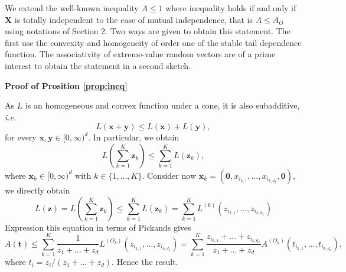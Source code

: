 \documentclass[11pt]{article}
\makeatletter
\renewenvironment{proof}[1][\proofname]{\par
\pushQED{\qed}%
\normalfont \topsep6\p@\@plus6\p@\relax
\trivlist
\item\relax
{\textbf{
#1\@addpunct{ }}}\hspace\labelsep\ignorespaces
}{%
\popQED\endtrivlist\@endpefalse
}
\makeatother
\begin{document}
	We extend the well-known inequality $A \leq 1$ where inequality holds if and only if $\textbf{X}$ is totally independent to the case of mutual independence, that is $A \leq A_{O}$ using notations of Section 2. Two ways are given to obtain this statement. The first use the convexity and homogeneity of order one of the stable tail dependence function. The associativity of extreme-value random vectors are of a prime interest to obtain the statement in a second sketch.
	
	\begin{proof}[Proof of Prosition \ref{prop:ineq}]
		As $L$ is an homogeneous and convex function under a cone, it is also subadditive, \emph{i.e.} $$L(\textbf{x} + \textbf{y}) \leq L(\textbf{x}) + L(\textbf{y}),$$ for every $\textbf{x}, \textbf{y} \in [0, \infty)^d$. In particular, we obtain $$L(\sum_{k=1}^K \textbf{z}_k) \leq \sum_{k=1}^K L(\textbf{z}_k),$$ where $\textbf{x}_k \in [0, \infty)^d$ with $k \in \{1,\dots, K\}$. Consider now $\textbf{x}_k = (\textbf{0}, x_{i_{k,1}}, \dots, x_{i_{k,d_k}}, \textbf{0})$, we directly obtain
	\begin{equation*}
		L(\textbf{z}) = L(\sum_{k=1}^K \textbf{z}_k) \leq \sum_{k=1}^K L(\textbf{z}_k) = \sum_{k=1}^K L^{(k)} (z_{i_{k,1}}, \dots, z_{i_{k,d_k}})
	\end{equation*}
	Expression this equation in terms of Pickands gives
	\begin{equation*}
		A(\textbf{t}) \leq \sum_{k=1}^K \frac{1}{z_1 + \dots + z_d} L^{(O_k)}(z_{i_{k,1}}, \dots, z_{i_{k,d_k}}) = \sum_{k=1}^K \frac{z_{i_{k,1}} + \dots + z_{i_{k,d_k}}}{z_1 + \dots + z_d} A^{(O_k)}(t_{i_{k,1}}, \dots, t_{i_{k,d_k}}),
	\end{equation*}
	where $t_i = z_i / (z_1 + \dots + z_d)$. Hence the result.
	

\end{proof}
\end{document}
